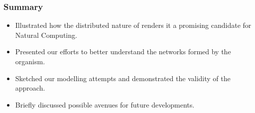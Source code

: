 \documentclass[	hyperref={pdfpagelabels=false}, xcolor=dvipsnames,
		11pt]{beamer}
\begin{document}
\begin{frame}
	\frametitle{Summary}

	\begin{itemize}
		\item Illustrated how the distributed nature of \Pp renders it a promising candidate for Natural Computing.
		\item Presented our efforts to better understand the networks formed by the organism.
		\item Sketched our modelling attempts and demonstrated the validity of the approach.
		\item Briefly discussed possible avenues for future developments.
	\end{itemize}
\end{frame}



\end{document}

